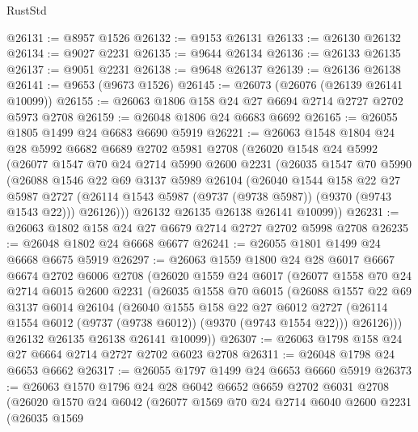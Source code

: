 \begin{lexlean}{RustStd}
\begin{coremodule}
@26131 := @8957 @1526
@26132 := @9153 @26131
@26133 := @26130 @26132
@26134 := @9027 @2231
@26135 := @9644 @26134
@26136 := @26133 @26135
@26137 := @9051 @2231
@26138 := @9648 @26137
@26139 := @26136 @26138
@26141 := @9653 (@9673 @1526)
@26145 := @26073 (@26076 (@26139 @26141 @10099))
@26155 := @26063 @1806 @158 @24 @27 @6694 @2714 @2727 @2702 @5973 @2708
@26159 := @26048 @1806 @24 @6683 @6692
@26165 := @26055 @1805 @1499 @24 @6683 @6690 @5919
@26221 := @26063
    @1548
    @1804
    @24
    @28
    @5992
    @6682
    @6689
    @2702
    @5981
    @2708
    (@26020
      @1548
      @24
      @5992
      (@26077
        @1547
        @70
        @24
        @2714
        @5990
        @2600
        @2231
        (@26035
          @1547
          @70
          @5990
          (@26088
            @1546
            @22
            @69
            @3137
            @5989
            @26104
            (@26040
              @1544
              @158
              @22
              @27
              @5987
              @2727
              (@26114 @1543 @5987 (@9737 (@9738 @5987)) (@9370 (@9743 @1543 @22)))
              @26126)))
        @26132
        @26135
        @26138
        @26141
        @10099))
@26231 := @26063 @1802 @158 @24 @27 @6679 @2714 @2727 @2702 @5998 @2708
@26235 := @26048 @1802 @24 @6668 @6677
@26241 := @26055 @1801 @1499 @24 @6668 @6675 @5919
@26297 := @26063
    @1559
    @1800
    @24
    @28
    @6017
    @6667
    @6674
    @2702
    @6006
    @2708
    (@26020
      @1559
      @24
      @6017
      (@26077
        @1558
        @70
        @24
        @2714
        @6015
        @2600
        @2231
        (@26035
          @1558
          @70
          @6015
          (@26088
            @1557
            @22
            @69
            @3137
            @6014
            @26104
            (@26040
              @1555
              @158
              @22
              @27
              @6012
              @2727
              (@26114 @1554 @6012 (@9737 (@9738 @6012)) (@9370 (@9743 @1554 @22)))
              @26126)))
        @26132
        @26135
        @26138
        @26141
        @10099))
@26307 := @26063 @1798 @158 @24 @27 @6664 @2714 @2727 @2702 @6023 @2708
@26311 := @26048 @1798 @24 @6653 @6662
@26317 := @26055 @1797 @1499 @24 @6653 @6660 @5919
@26373 := @26063
    @1570
    @1796
    @24
    @28
    @6042
    @6652
    @6659
    @2702
    @6031
    @2708
    (@26020
      @1570
      @24
      @6042
      (@26077
        @1569
        @70
        @24
        @2714
        @6040
        @2600
        @2231
        (@26035
          @1569

\end{coremodule}
\end{lexlean}
